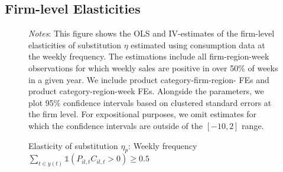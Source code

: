 \subsection{Firm-level Elasticities}

\begin{figure}[H]
    \centering
    \caption{Elasticity of substitution $\eta_p$: Weekly frequency $\sum_{t \in y(t)} \mathbb{1}(P_{il,t}C_{il,t} > 0) \geq 0.5$}
    \label{fig: app_elas_eta_cats_weekly_50ptt}
    
     \parbox{\textwidth}{
        \begin{spacing}{1} 
            {\footnotesize 
            \textit{Notes}: This figure shows the OLS and IV-estimates of the firm-level elasticities of substitution $\eta$ estimated using consumption data at the weekly frequency. The estimations include all firm-region-week observations for which weekly sales are positive in over 50\% of weeks in a given year. We include product category-firm-region- FEs and product category-region-week FEs. Alongside the parameters, we plot 95\% confidence intervals based on clustered standard errors at the firm level. For expositional purposes, we omit estimates for which the confidence intervals are outside of the $[-10,2]$ range.}
        \end{spacing}}
 \end{figure} 

